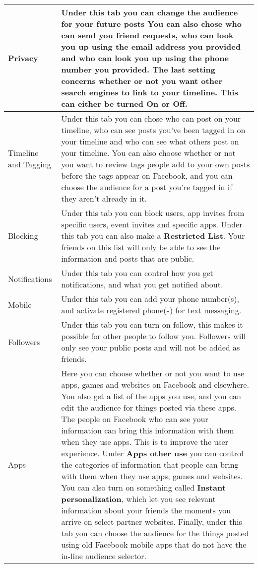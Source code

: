 \begin{center}
\begin{longtable}{ | l | p{9cm} |}
    \hline
    Privacy & Under this tab you can change the audience for your future posts You can also chose who can send you friend requests, who can look you up using the email address you provided and who can look you up using the phone number you provided. The last setting concerns whether or not you want other search engines to link to your timeline. This can either be turned On or Off.\\
    \hline
    Timeline and Tagging & Under this tab you can chose who can post on your timeline, who can see posts you've been tagged in on your timeline and who can see what others post on your timeline. You can also choose whether or not you want to review tags people add to your own posts before the tags appear on Facebook, and you can choose the audience for a post you're tagged in if they aren't already in it.\\
	\hline
    Blocking & Under this tab you can block users, app invites from specific users, event invites and specific apps. Under this tab you can also make a \textbf{Restricted List}. Your friends on this list will only be able to see the information and posts that are public.\\
    \hline
    Notifications & Under this tab you can control how you get notifications, and what you get notified about.\\
    \hline
    Mobile & Under this tab you can add your phone number(s), and activate registered phone(s) for text messaging.\\
    \hline
    Followers & Under this tab you can turn on follow, this makes it possible for other people to follow you. Followers will only see your public posts and will not be added as friends.\\
    \hline
    Apps & Here you can choose whether or not you want to use apps, games and websites on Facebook and elsewhere. You also get a list of the apps you use, and you can edit the audience for things posted via these apps. The people on Facebook who can see your information can bring this information with them when they use apps. This is to improve the user experience. Under \textbf{Apps other use} you can control the categories of information that people can bring with them when they use apps, games and websites. You can also turn on something called \textbf{Instant personalization}, which let you see relevant information about your friends the moments you arrive on select partner websites. Finally, under this tab you can choose the audience for the things posted using old Facebook mobile apps that do not have the in-line audience selector.\\ 
    \hline
    \end{longtable}
\end{center}




